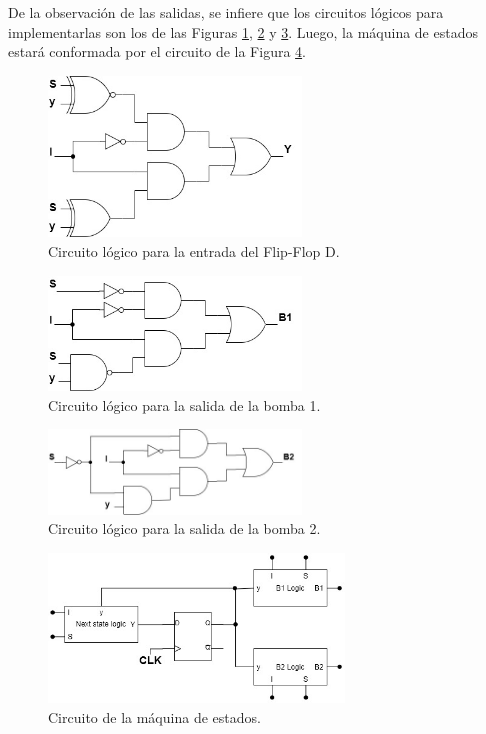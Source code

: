De la observación de las salidas, se infiere que los circuitos lógicos para implementarlas son los de las Figuras \ref{fig:Y_logic_circuit_ex5}, 
\ref{fig:B1_logic_circuit_ex5} y \ref{fig:B2_logic_circuit_ex5}.
Luego, la máquina de estados estará conformada por el circuito de la Figura \ref{fig:fsm_circtuit_ex5}.
\begin{figure}[H]
    \centering
    \includegraphics[width=0.6\textwidth]{../EJ1/Recursos/Y_logic_circuit.jpg}
    \caption{Circuito lógico para la entrada del Flip-Flop D.}
    \label{fig:Y_logic_circuit_ex5}
\end{figure}
\begin{figure}[H]
    \centering
    \includegraphics[width=0.6\textwidth]{../EJ1/Recursos/B1_logic_circuit.jpg}
    \caption{Circuito lógico para la salida de la bomba 1.}
    \label{fig:B1_logic_circuit_ex5}
\end{figure}
\begin{figure}[H]
    \centering
    \includegraphics[width=0.6\textwidth]{../EJ1/Recursos/B2_logic_circuit.jpg}
    \caption{Circuito lógico para la salida de la bomba 2.}
    \label{fig:B2_logic_circuit_ex5}
\end{figure}
\begin{figure}[H]
    \centering
    \includegraphics[width=0.7\textwidth]{../EJ1/Recursos/fsm_circuit.jpg}
    \caption{Circuito de la máquina de estados.}
    \label{fig:fsm_circtuit_ex5}
\end{figure}
